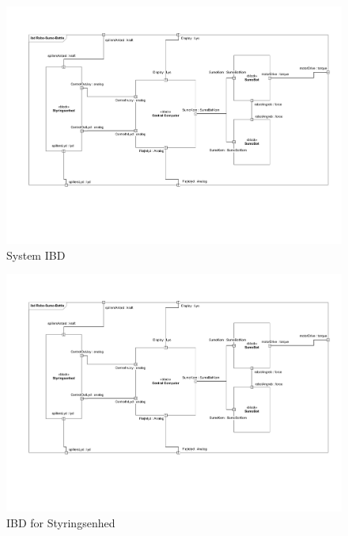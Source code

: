 \begin{figure}
	\centering
   	\includegraphics[page=1,width=1\linewidth]{figs/Diagrammer/IBD.pdf}
	\caption{System IBD}
	\label{fig:IBD_System}
\end{figure}
\begin{figure}
	\centering
   	\includegraphics[page=2,width=1\linewidth]{figs/Diagrammer/IBD.pdf}
	\caption{IBD for Styringsenhed}
	\label{fig:IBD_Styringsenhed}
\end{figure}

